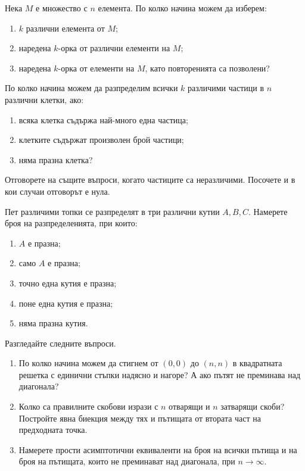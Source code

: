 \documentclass[11pt,a4paper]{article}
\newenvironment{enumeratea}{\begin{enumerate}[label=(\alph*),itemsep=0.28em,topsep=0.25em]}{\end{enumerate}}
\newcounter{problem}[section]
\begin{document}
\begin{problembook}
Нека $M$ е множество с $n$ елемента. По колко начина можем да изберем:
\begin{enumeratea}
  \item $k$ различни елемента от $M$;
  \item наредена $k$-орка от различни елементи на $M$;
  \item наредена $k$-орка от елементи на $M$, като повторенията са позволени?
\end{enumeratea}
\end{problembook}

\begin{problem}
По колко начина можем да разпределим всички $k$ различими частици в $n$
различни клетки, ако:
\begin{enumeratea}
  \item всяка клетка съдържа най-много една частица;
  \item клетките съдържат произволен брой частици;
  \item няма празна клетка?
\end{enumeratea}
Отговорете на същите въпроси, когато частиците са неразличими. Посочете
и в кои случаи отговорът е нула.
\end{problem}

\begin{problem}
Пет различими топки се разпределят в три различни кутии $A,B,C$. Намерете броя
на разпределенията, при които:
\begin{enumeratea}
  \item $A$ е празна;
  \item само $A$ е празна;
  \item точно една кутия е празна;
  \item поне една кутия е празна;
  \item няма празна кутия.
\end{enumeratea}
\end{problem}

\begin{problemstar}
Разгледайте следните въпроси.
\begin{enumeratea}
  \item По колко начина можем да стигнем от $(0,0)$ до $(n,n)$ в квадратната
  решетка с единични стъпки надясно и нагоре? А ако пътят не преминава над диагонала?
  \item Колко са правилните скобови изрази с $n$ отварящи и $n$ затварящи
  скоби? Постройте явна биекция между тях и пътищата от втората част на
  предходната точка.
  \item Намерете прости асимптотични еквиваленти на броя на всички пътища
  и на броя на пътищата, които не преминават над диагонала, при $n\to\infty$.
\end{enumeratea}
\end{problemstar}
\end{document}

